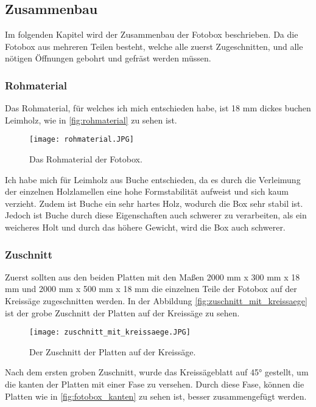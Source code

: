 \subsection{Zusammenbau}

Im folgenden Kapitel wird der Zusammenbau der Fotobox beschrieben.
Da die Fotobox aus mehreren Teilen besteht, welche alle zuerst Zugeschnitten,
und alle nötigen Öffnungen gebohrt und gefräst werden müssen.

\subsubsection{Rohmaterial}

Das Rohmaterial, für welches ich mich entschieden habe, ist 18 mm dickes buchen
Leimholz, wie in \autoref{fig:rohmaterial} zu sehen ist.

\begin{figure}[H]
    \centering
    \texttt{[image: rohmaterial.JPG]}
    \caption{Das Rohmaterial der Fotobox.}
    \label{fig:rohmaterial}
\end{figure}

Ich habe mich für Leimholz aus Buche entschieden, da es durch die Verleimung der
einzelnen Holzlamellen eine hohe Formstabilität aufweist und sich kaum verzieht.
Zudem ist Buche ein sehr hartes Holz, wodurch die Box sehr stabil ist.
Jedoch ist Buche durch diese Eigenschaften auch schwerer zu verarbeiten,
als ein weicheres Holt und durch das höhere Gewicht, wird die Box auch schwerer.

\newpage

\subsubsection{Zuschnitt}

Zuerst sollten aus den beiden Platten mit den Maßen 2000 mm x 300 mm x 18 mm und 
2000 mm x 500 mm x 18 mm die einzelnen Teile der Fotobox auf der Kreissäge
zugeschnitten werden. In der Abbildung \autoref{fig:zuschnitt_mit_kreissaege} ist der grobe 
Zuschnitt der Platten auf der Kreissäge zu sehen.

\begin{figure}[H]
    \centering
    \texttt{[image: zuschnitt\_mit\_kreissaege.JPG]}
    \caption{Der Zuschnitt der Platten auf der Kreissäge.}
    \label{fig:zuschnitt_mit_kreissaege}
\end{figure}

Nach dem ersten groben Zuschnitt, wurde das Kreissägeblatt auf 45° gestellt, um
die kanten der Platten mit einer Fase zu versehen. Durch diese Fase, können die Platten
wie in \autoref{fig:fotobox_kanten} zu sehen ist, besser zusammengefügt werden.

